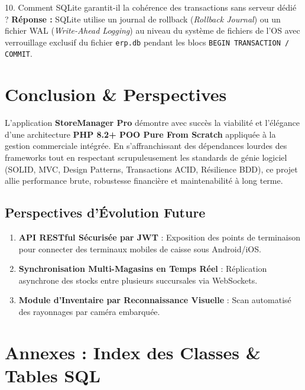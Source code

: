 \documentclass[11pt,a4paper,titlepage,twoside,openright]{report}
\begin{document}
\begin{oralbox}{10. Comment SQLite garantit-il la cohérence des transactions sans serveur dédié ?}
\textbf{Réponse :} SQLite utilise un journal de rollback (\emph{Rollback Journal}) ou un fichier WAL (\emph{Write-Ahead Logging}) au niveau du système de fichiers de l'OS avec verrouillage exclusif du fichier \texttt{erp.db} pendant les blocs \texttt{BEGIN TRANSACTION / COMMIT}.
\end{oralbox}

\chapter*{Conclusion \& Perspectives}

L'application \textbf{StoreManager Pro} démontre avec succès la viabilité et l'élégance d'une architecture \textbf{PHP 8.2+ POO Pure From Scratch} appliquée à la gestion commerciale intégrée. En s'affranchissant des dépendances lourdes des frameworks tout en respectant scrupuleusement les standards de génie logiciel (SOLID, MVC, Design Patterns, Transactions ACID, Résilience BDD), ce projet allie performance brute, robustesse financière et maintenabilité à long terme.

\section*{Perspectives d'Évolution Future}
\begin{enumerate}
    \item \textbf{API RESTful Sécurisée par JWT} : Exposition des points de terminaison pour connecter des terminaux mobiles de caisse sous Android/iOS.
    \item \textbf{Synchronisation Multi-Magasins en Temps Réel} : Réplication asynchrone des stocks entre plusieurs succursales via WebSockets.
    \item \textbf{Module d'Inventaire par Reconnaissance Visuelle} : Scan automatisé des rayonnages par caméra embarquée.
\end{enumerate}

\clearpage

\chapter*{Annexes : Index des Classes \& Tables SQL}
\end{document}
